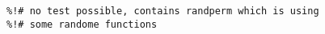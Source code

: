 \begin{verbatim}
%!# no test possible, contains randperm which is using
%!# some randome functions
\end{verbatim}
